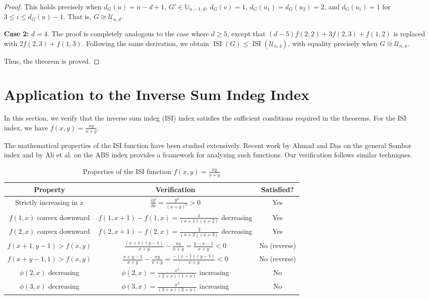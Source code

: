 \documentclass[12pt]{article}
\theoremstyle{definition}
\newcommand{\ISI}{\operatorname{ISI}}
\newcommand{\UU}{\mathbb{U}}
\begin{document}
\begin{proof}
This holds precisely when \(d_G(u) = n-d+1\), \(G' \in \UU_{n-1,d}\), \(d_G(v) = 1\), \(d_G(u_1) = d_G(u_2) = 2\), and \(d_G(u_i) = 1\) for \(3 \leq i \leq d_G(u)-1\). That is, \(G \cong \mathcal{U}_{n,d}\).

\textbf{Case 2:} \(d = 4\). The proof is completely analogous to the case where \(d \geq 5\), except that \((d-5)f(2,2) + 3f(2,3) + f(1,2)\) is replaced with \(2f(2,3) + f(1,3)\). Following the same derivation, we obtain \(\ISI(G) \leq \ISI(\mathcal{U}_{n,4})\), with equality precisely when \(G \cong \mathcal{U}_{n,4}\).

Thus, the theorem is proved.
\end{proof}

\section{Application to the Inverse Sum Indeg Index}

In this section, we verify that the inverse sum indeg (ISI) index satisfies the sufficient conditions required in the theorems. For the ISI index, we have \(f(x,y) = \frac{xy}{x+y}\).

The mathematical properties of the ISI function have been studied extensively. Recent work by Ahmad and Das \cite{ahmad2025general} on the general Sombor index and by Ali et al. \cite{ali2022abs} on the ABS index provides a framework for analyzing such functions. Our verification follows similar techniques.

\begin{table}[h]
\centering
\caption{Properties of the ISI function \(f(x,y) = \frac{xy}{x+y}\)}
\begin{tabular}{|c|c|c|}
\hline
\textbf{Property} & \textbf{Verification} & \textbf{Satisfied?} \\
\hline
Strictly increasing in \(x\) & \(\frac{\partial f}{\partial x} = \frac{y^2}{(x+y)^2} > 0\) & Yes  \\
\hline
\(f(1,x)\) convex downward & \(f(1,x+1)-f(1,x) = \frac{1}{(x+1)(x+2)}\) decreasing & Yes  \\
\hline
\(f(2,x)\) convex downward & \(f(2,x+1)-f(2,x) = \frac{2}{(x+2)(x+3)}\) decreasing & Yes \\
\hline
\(f(x+1,y-1) > f(x,y)\) & \(\frac{(x+1)(y-1)}{x+y} - \frac{xy}{x+y} = \frac{y-x-1}{x+y} < 0\) & No  (reverse) \\
\hline
\(f(x+y-1,1) > f(x,y)\) & \(\frac{x+y-1}{x+y} - \frac{xy}{x+y} = \frac{-(x-1)(y-1)}{x+y} < 0\) & No  (reverse) \\
\hline
\(\phi(2,x)\) decreasing & \(\phi(2,x) = \frac{x^2}{(2+x)(1+x)}\) increasing & No  \\
\hline
\(\phi(3,x)\) decreasing & \(\phi(3,x) = \frac{x^2}{(3+x)(2+x)}\) increasing & No \\
\hline
\end{tabular}
\label{tab:isi_properties}
\end{table}
\end{document}
